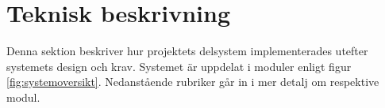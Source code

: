     \section{Teknisk beskrivning}
\label{tekbeskrivning}



Denna sektion beskriver hur projektets delsystem implementerades utefter systemets design och krav.
Systemet är uppdelat i moduler enligt figur \ref{fig:systemoversikt}. Nedanstående rubriker går in i mer detalj om respektive modul.



